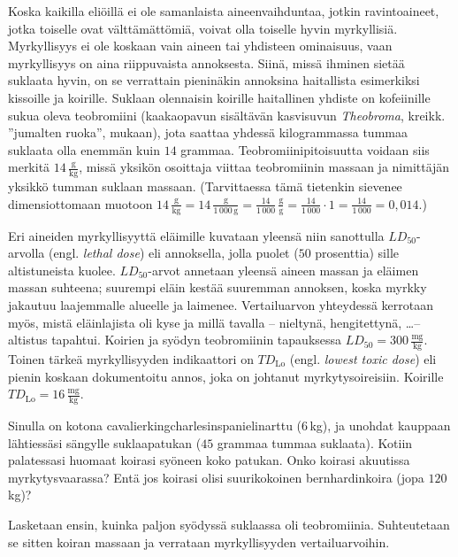 \begin{esimerkki}
Koska kaikilla eliöillä ei ole samanlaista aineenvaihduntaa, jotkin ravintoaineet, jotka toiselle ovat välttämättömiä, voivat olla toiselle hyvin myrkyllisiä. Myrkyllisyys ei ole koskaan vain aineen tai yhdisteen ominaisuus, vaan myrkyllisyys on aina riippuvaista annoksesta. Siinä, missä ihminen sietää suklaata hyvin, on se verrattain pieninäkin annoksina haitallista esimerkiksi kissoille ja koirille. Suklaan olennaisin koirille haitallinen yhdiste on kofeiinille sukua oleva teobromiini (kaakaopavun sisältävän kasvisuvun \textit{Theobroma}, kreikk. ''jumalten ruoka'', mukaan), jota saattaa yhdessä kilogrammassa tummaa suklaata olla enemmän kuin $14$ grammaa. Teobromiinipitoisuutta voidaan siis merkitä $14\,\frac{\text{g}}{\text{kg}}$, missä yksikön osoittaja viittaa teobromiinin massaan ja nimittäjän yksikkö tumman suklaan massaan. (Tarvittaessa tämä tietenkin sievenee dimensiottomaan muotoon $14\,\frac{\text{g}}{\text{kg}}=14\,\frac{\text{g}}{1\,000\,\text{g}}=\frac{14}{1\,000}\,\frac{\text{g}}{\text{g}}=\frac{14}{1\,000}\cdot 1=\frac{14}{1\,000}=0,014$.)

Eri aineiden myrkyllisyyttä eläimille kuvataan yleensä niin sanottulla $LD_{50}$-arvolla (engl. \textit{lethal dose}) eli annoksella, jolla puolet ($50$ prosenttia) sille altistuneista kuolee. $LD_{50}$-arvot annetaan yleensä aineen massan ja eläimen massan suhteena; suurempi eläin kestää suuremman annoksen, koska myrkky jakautuu laajemmalle alueelle ja laimenee. Vertailuarvon yhteydessä kerrotaan myös, mistä eläinlajista oli kyse ja millä tavalla -- nieltynä, hengitettynä, \ldots -- altistus tapahtui. Koirien ja syödyn teobromiinin tapauksessa $LD_{50}=300\,\frac{\text{mg}}{\text{kg}}$. Toinen tärkeä myrkyllisyyden indikaattori on $T\!D_\text{Lo}$ (engl. \textit{lowest toxic dose}) eli pienin koskaan dokumentoitu annos, joka on johtanut myrkytysoireisiin. Koirille $T\!D_\text{Lo}=16\,\frac{\text{mg}}{\text{kg}}$.

Sinulla on kotona cavalierkingcharlesinspanielinarttu ($6$\,kg), ja unohdat kauppaan lähtiessäsi sängylle suklaapatukan ($45$ grammaa tummaa suklaata). Kotiin palatessasi huomaat koirasi syöneen koko patukan. Onko koirasi akuutissa myrkytysvaarassa? Entä jos koirasi olisi suurikokoinen bernhardinkoira (jopa $120$\,kg)?
	\begin{esimratk}
	Lasketaan ensin, kuinka paljon syödyssä suklaassa oli teobromiinia. Suhteutetaan se sitten koiran massaan ja verrataan myrkyllisyyden vertailuarvoihin.
	

\end{esimratk}
\end{esimerkki}
